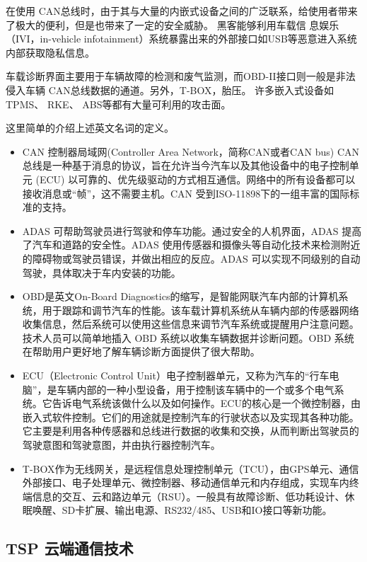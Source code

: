 在使用 CAN总线时，由于其与大量的内嵌式设备之间的广泛联系，给使用者带来了极大的便利，但是也带来了一定的安全威胁。
黑客能够利用车载信
息娱乐（IVI，in-vehicle infotainment）系统暴露出来的外部接口如USB等恶意进入系统内部获取隐私信息。

车载诊断界面主要用于车辆故障的检测和废气监测，而OBD-II接口则一般是非法侵入车辆 CAN总线数据的通道。另外，T-BOX，胎压。
许多嵌入式设备如 TPMS、 RKE、 ABS等都有大量可利用的攻击面。

这里简单的介绍上述英文名词的定义。
\begin{itemize}
    \item CAN 控制器局域网(Controller Area Network，简称CAN或者CAN bus) CAN 总线是一种基于消息的协议，旨在允许当今汽车以及其他设备中的电子控制单元 (ECU) 以可靠的、优先级驱动的方式相互通信。网络中的所有设备都可以接收消息或“帧”，这不需要主机。CAN 受到ISO-11898下的一组丰富的国际标准的支持。
    \item ADAS 可帮助驾驶员进行驾驶和停车功能。通过安全的人机界面，ADAS 提高了汽车和道路的安全性。ADAS 使用传感器和摄像头等自动化技术来检测附近的障碍物或驾驶员错误，并做出相应的反应。ADAS 可以实现不同级别的自动驾驶，具体取决于车内安装的功能。
    \item OBD是英文On-Board Diagnostics的缩写，是智能网联汽车内部的计算机系统，用于跟踪和调节汽车的性能。该车载计算机系统从车辆内部的传感器网络收集信息，然后系统可以使用这些信息来调节汽车系统或提醒用户注意问题。技术人员可以简单地插入 OBD 系统以收集车辆数据并诊断问题。OBD 系统在帮助用户更好地了解车辆诊断方面提供了很大帮助。
    \item ECU（Electronic Control Unit）电子控制器单元，又称为汽车的“行车电脑”，是车辆内部的一种小型设备，用于控制该车辆中的一个或多个电气系统。它告诉电气系统该做什么以及如何操作。ECU的核心是一个微控制器，由嵌入式软件控制。它们的用途就是控制汽车的行驶状态以及实现其各种功能。它主要是利用各种传感器和总线进行数据的收集和交换，从而判断出驾驶员的驾驶意图和驾驶意图，并由执行器控制汽车。
    \item T-BOX作为无线网关，是远程信息处理控制单元（TCU），由GPS单元、通信外部接口、电子处理单元、微控制器、移动通信单元和内存组成，实现车内终端信息的交互、云和路边单元（RSU）。一般具有故障诊断、低功耗设计、休眠唤醒、SD卡扩展、输出电源、RS232/485、USB和IO接口等新功能。
\end{itemize}
\subsection{TSP 云端通信技术}


